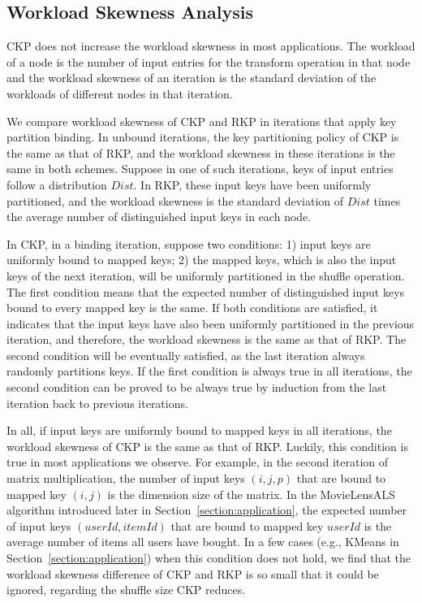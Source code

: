 \documentclass[10pt,journal,compsoc]{IEEEtran}
\begin{document}
\subsection{Workload Skewness Analysis}\label{section:skew}
CKP does not increase the workload skewness in most applications. 
The workload of a node is the number of input entries for the transform
operation in that node and 
the workload skewness of an iteration is the standard deviation of the workloads of different nodes in that iteration. 


We compare workload skewness of CKP and RKP in iterations 
that apply key partition binding.
In unbound iterations, the key partitioning policy of CKP is the same as that of RKP, and the workload skewness in these iterations is the same in both schemes.
Suppose in one of such iterations, keys of input entries follow a distribution $Dist$. 
In RKP, these input keys have been uniformly partitioned, 
and the workload skewness is the standard deviation of $Dist$ times 
the average number of distinguished input keys in each node. 

In CKP, in a binding iteration, suppose two conditions: 
1) input keys are uniformly bound to mapped keys;
2) the mapped keys, which is also the input keys of the next iteration, will be uniformly partitioned in the shuffle operation.
The first condition means that the expected number of distinguished input keys bound to every mapped key is the same.
If both conditions are satisfied, it indicates that the input keys have also 
been uniformly partitioned in the previous iteration,
and therefore, the workload skewness is the same as that of RKP.
The second condition will be eventually satisfied, as the last iteration always randomly partitions keys. 
If the first condition is always true in all iterations, 
the second condition can be proved to be always true by induction from the last iteration back to previous iterations. 

In all, if input keys are uniformly bound to mapped keys in all iterations, the workload skewness of CKP 
is the same as that of RKP. 
Luckily, this condition is true in most applications we observe.
For example, in the second iteration of matrix multiplication, 
the number of input keys $(i,j,p)$ that
are bound to mapped key $(i,j)$ is the dimension size of the matrix.
In the MovieLensALS algorithm introduced later in Section~\ref{section:application}, the expected number of input keys $(userId, itemId)$
that are bound to mapped key $userId$ is the average number of items all users have bought.
In a few cases (e.g., KMeans in Section~\ref{section:application}) when this condition does not hold, 
we find that the workload skewness difference of CKP and RKP is so small  that it could be ignored, regarding the shuffle size CKP reduces.
\end{document}

